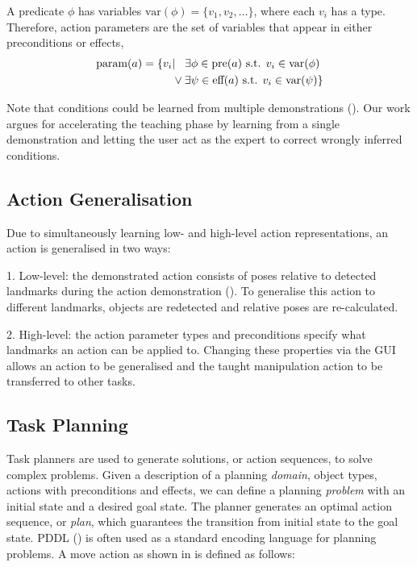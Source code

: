 A predicate $\phi$ has variables $\text{var}(\phi) = \{v_1, v_2, \dots\}$, where each $v_i$ has a type.
Therefore, action parameters are the set of variables that appear in either preconditions or effects, \ie
\begin{align*}
     \text{param}(a) = \{v_i &| \hspace{0.3cm}\exists \phi \in \text{pre}(a) \text{ s.t. } v_i \in \text{var}(\phi)\\
     &\lor \exists \psi \in \text{eff}(a) \text{ s.t. } v_i \in \text{var}(\psi) \}
\end{align*}

Note that conditions could be learned from multiple demonstrations (\cite{abdo2013learning,konidaris2018fromSkills}).
Our work argues for accelerating the teaching phase by learning from a single demonstration and letting the user act as the expert to correct wrongly inferred conditions.

 
\subsection{Action Generalisation}
\label{sec:generalisation}
Due to simultaneously learning low- and high-level action representations, an action is generalised in two ways:

1. Low-level: the demonstrated action consists of poses relative to detected landmarks during the action demonstration (). 
To generalise this action to different landmarks, objects are redetected and relative poses are re-calculated.

2. High-level: the action parameter types and preconditions specify what landmarks an action can be applied to. 
Changing these properties via the GUI allows an action to be generalised and the taught manipulation action to be transferred to other tasks.


\subsection{Task Planning}
\label{sec:planning}
Task planners are used to generate solutions, or action sequences, to solve complex problems.
Given a description of a planning \textit{domain}, \ie object types, actions with preconditions and effects, we can define a planning \textit{problem} with an initial state and a desired goal state. 
The planner generates an optimal action sequence, or \textit{plan}, which guarantees the transition from initial state to the goal state. 
PDDL (\cite{mcdermott1998pddl}) %
is often used as a standard encoding language for planning problems.
A move action as shown in  is defined as follows:

